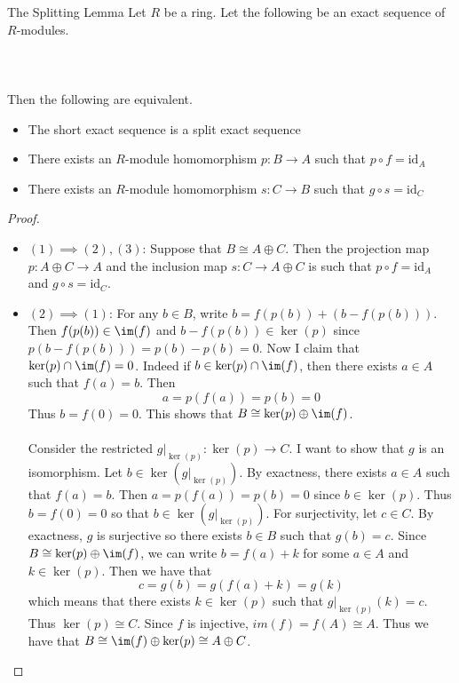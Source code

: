 \documentclass[a4paper]{article}
\begin{document}
\begin{prp}{The Splitting Lemma}{} Let $R$ be a ring. Let the following be an exact sequence of $R$-modules. \\~\\
\\~\\
Then the following are equivalent. 
\begin{itemize}
\item The short exact sequence is a split exact sequence
\item There exists an $R$-module homomorphism $p:B\to A$ such that $p\circ f=\text{id}_A$
\item There exists an $R$-module homomorphism $s:C\to B$ such that $g\circ s=\text{id}_C$
\end{itemize} 
\begin{proof}~\\
\begin{itemize}
\item $(1)\implies(2),(3)$: Suppose that $B\cong A\oplus C$. Then the projection map $p:A\oplus C\to A$ and the inclusion map $s:C\to A\oplus C$ is such that $p\circ f=\text{id}_A$ and $g\circ s=\text{id}_C$. 

\item $(2)\implies(1)$: For any $b\in B$, write $b=f(p(b))+(b-f(p(b)))$. Then $f(p(b))\in\im(f)$ and $b-f(p(b))\in\ker(p)$ since $p(b-f(p(b)))=p(b)-p(b)=0$. Now I claim that $\ker(p)\cap\im(f)=0$. Indeed if $b\in\ker(p)\cap\im(f)$, then there exists $a\in A$ such that $f(a)=b$. Then $$a=p(f(a))=p(b)=0$$ Thus $b=f(0)=0$. This shows that $B\cong\ker(p)\oplus\im(f)$. \\~\\

Consider the restricted $g|_{\ker(p)}:\ker(p)\to C$. I want to show that $g$ is an isomorphism. Let $b\in\ker\left(g|_{\ker(p)}\right)$. By exactness, there exists $a\in A$ such that $f(a)=b$. Then $a=p(f(a))=p(b)=0$ since $b\in\ker(p)$. Thus $b=f(0)=0$ so that $b\in\ker\left(g|_{\ker(p)}\right)$. For surjectivity, let $c\in C$. By exactness, $g$ is surjective so there exists $b\in B$ such that $g(b)=c$. Since $B\cong\ker(p)\oplus\im(f)$, we can write $b=f(a)+k$ for some $a\in A$ and $k\in\ker(p)$. Then we have that $$c=g(b)=g(f(a)+k)=g(k)$$ which means that there exists $k\in\ker(p)$ such that $g|_{\ker(p)}(k)=c$. Thus $\ker(p)\cong C$. Since $f$ is injective, $im(f)=f(A)\cong A$. Thus we have that $B\cong\im(f)\oplus\ker(p)\cong A\oplus C$. 


\end{itemize}
\end{proof}
\end{prp}
\end{document}

